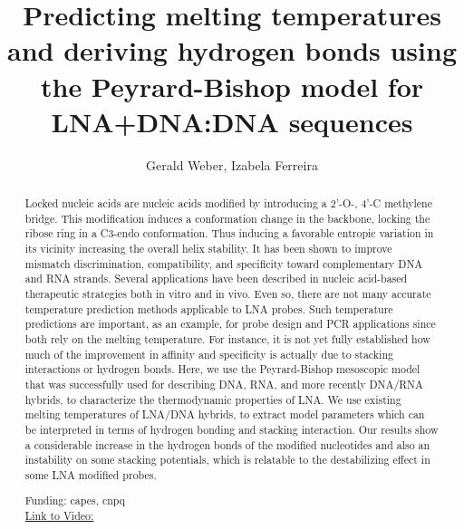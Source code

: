 \documentclass[twoside]{article}
\title{\vspace{-15mm}\fontsize{24pt}{10pt}\selectfont\textbf{ Predicting melting temperatures and deriving hydrogen bonds using the Peyrard-Bishop model for LNA+DNA:DNA sequences }} %
\author{ Gerald Weber,  Izabela Ferreira }
\affil{ UFMG - UNIVERSIDADE FEDERAL DE MINAS GERAISn,  UFMG - Departamento de F\'{\i}sica }
\date{}
\begin{document}
  
  
  \maketitle %
  
  
  \thispagestyle{fancy} %
  
  
  \begin{abstract}
  Locked nucleic acids are nucleic acids modified by introducing a 2'-O-, 4'-C methylene bridge. This modification induces a conformation change in the backbone,  locking the ribose ring in a C3-endo conformation. Thus inducing a favorable entropic variation in its vicinity increasing the overall helix stability. It has been shown to improve mismatch discrimination,  compatibility,  and specificity toward complementary DNA and RNA strands. Several applications have been described in nucleic acid-based therapeutic strategies both in vitro and in vivo. Even so,  there are not many accurate temperature prediction methods applicable to LNA probes. Such temperature predictions are important,  as an example,  for probe design and PCR applications since both rely on the melting temperature. For instance,  it is not yet fully established how much of the improvement in affinity and specificity is actually due to stacking interactions or hydrogen bonds. Here,  we use the Peyrard-Bishop mesoscopic model that was successfully used for describing DNA,  RNA,  and more recently DNA/RNA hybrids,  to characterize the thermodynamic properties of LNA. We use existing melting temperatures of LNA/DNA hybrids,  to extract model parameters which can be interpreted in terms of hydrogen bonding and stacking interaction. Our results show a considerable increase in the hydrogen bonds of the modified nucleotides and also an instability on some stacking potentials,  which is relatable to the destabilizing effect in some LNA modified probes.
  
  Funding: capes, cnpq \\
  \href{http://ab3c.org.br/xpress_pres2020/xmxp2020-307886.html}{Link to Video:}

  \end{abstract}
   
  
\end{document}
